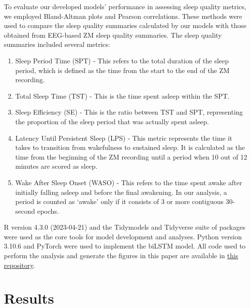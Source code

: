 \documentclass[
  super,
  preprint,
  3p]{elsarticle}
\begin{document}
To evaluate our developed models' performance in assessing sleep quality
metrics, we employed Bland-Altman plots and Pearson correlations. These
methods were used to compare the sleep quality summaries calculated by
our models with those obtained from EEG-based ZM sleep quality
summaries. The sleep quality summaries included several metrics:

\begin{enumerate}
\def\labelenumi{\arabic{enumi}.}
\item
  Sleep Period Time (SPT) - This refers to the total duration of the
  sleep period, which is defined as the time from the start to the end
  of the ZM recording.
\item
  Total Sleep Time (TST) - This is the time spent asleep within the SPT.
\item
  Sleep Efficiency (SE) - This is the ratio between TST and SPT,
  representing the proportion of the sleep period that was actually
  spent asleep.
\item
  Latency Until Persistent Sleep (LPS) - This metric represents the time
  it takes to transition from wakefulness to sustained sleep. It is
  calculated as the time from the beginning of the ZM recording until a
  period when 10 out of 12 minutes are scored as sleep.
\item
  Wake After Sleep Onset (WASO) - This refers to the time spent awake
  after initially falling asleep and before the final awakening. In our
  analysis, a period is counted as `awake' only if it consists of 3 or
  more contiguous 30-second epochs.
\end{enumerate}

R version 4.3.0 (2023-04-21)\citep{R-lang} and the
Tidymodels\citep{tidymodels} and Tidyverse\citep{tidyverse} suite of
packages were used as the core tools for model development and analyses.
Python version 3.10.6\citep{10.5555/1593511} and
PyTorch\citep{NEURIPS2019_9015} were used to implement the biLSTM model.
All code used to perform the analysis and generate the figures in this
paper are available in
\href{https://github.com/esbenlykke/sleep_study}{this repository}.

\hypertarget{results}{%
\section{Results}\label{results}}
\end{document}
